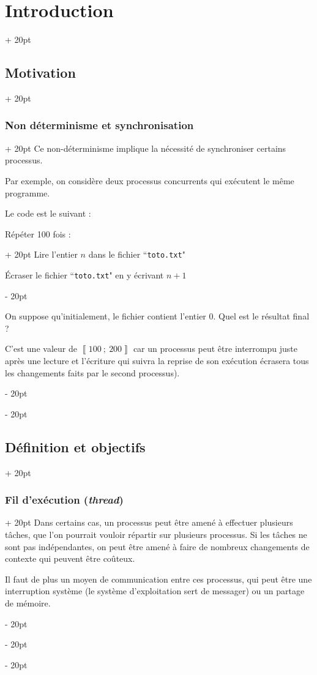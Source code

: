 \documentclass[a4paper, 12pt, twoside]{article}
\newcommand{\nset}[2]{\left\llbracket #1\ ;\ #2 \right\rrbracket}
\newcommand{\ind}[1][20pt]{\advance\leftskip + #1}
\newcommand{\deind}[1][20pt]{\advance\leftskip - #1}
\newenvironment{indt}[2][20pt]{#2 \par \ind[#1]}{\par \deind} %
\begin{document}
\begin{indt}{\section{Introduction}}
\begin{indt}{\subsection{Motivation}}
\begin{indt}{\subsubsection{Non déterminisme et synchronisation}}
                Ce non-déterminisme implique la nécessité de synchroniser certains processus.

                \vspace{6pt}
                
                Par exemple, on considère deux processus concurrents qui exécutent le même programme.

                Le code est le suivant :

                \begin{pseudocode}
                    \begin{indt}{Répéter 100 fois :}
                        Lire l'entier $n$ dans le fichier ``\texttt{toto.txt}"

                        Écraser le fichier ``\texttt{toto.txt}" en y écrivant $n + 1$
                    \end{indt}
                \end{pseudocode}

                On suppose qu'initialement, le fichier contient l'entier $0$.
                Quel est le résultat final ?

                C'est une valeur de $\nset{100}{200}$ car un processus peut être interrompu juste après une lecture et l'écriture qui suivra la reprise de son exécution écrasera tous les changements faits par le second processus).
            \end{indt}
        \end{indt}

        \vspace{12pt}
        
        \begin{indt}{\subsection{Définition et objectifs}}
            \begin{indt}{\subsubsection{Fil d'exécution (\textit{thread})}}
                Dans certains cas, un processus peut être amené à effectuer plusieurs tâches, que l'on pourrait vouloir répartir sur plusieurs processus.
                Si les tâches ne sont pas indépendantes, on peut être amené à faire de nombreux changements de contexte qui peuvent être coûteux.

                Il faut de plus un moyen de communication entre ces processus, qui peut être une interruption système (le système d'exploitation sert de messager) ou un partage de mémoire.


\end{indt}
\end{indt}
\end{indt}
\end{document}
